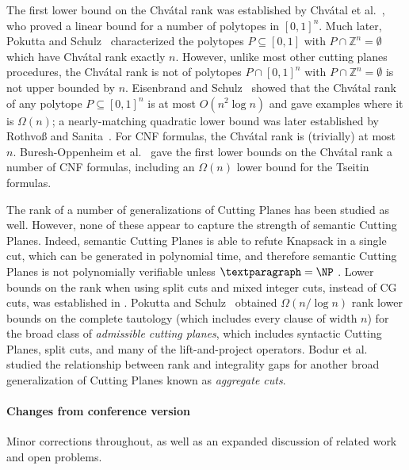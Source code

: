 \documentclass[11pt]{article}
\numberwithin{equation}{section}
\theoremstyle{definition}
\theoremstyle{plain}
\newcounter{cor}\renewcommand{\thecor}{1.1.\arabic{cor}}\newenvironment{cor}{\ifnum\value{cor}=0\refstepcounter{cor}\else\PackageError{toc-native-compat}{Unsupported additional cor envelope}{Only the one exact source-observed cor paragraph is allowed.}\fi}{}\providecommand{\corautorefname}{Theorem}
\begin{document}
The first lower bound on the Chv\'{a}tal rank was established by Chv\'{a}tal et al.~\cite{ChvatalCH89}, who proved a linear bound for a number of polytopes in $[0,1]^n$. Much later, Pokutta and Schulz~\cite{PokuttaS11a} characterized the polytopes $P \subseteq [0,1]$ with $P \cap \mathbb{Z}^n = \emptyset$ which have Chv\'{a}tal rank exactly $n$. However, unlike most other cutting planes procedures, the Chv\'{a}tal rank is not of polytopes $P \cap [0,1]^n$ with $P \cap \mathbb{Z}^n = \emptyset$ is not upper bounded by $n$. Eisenbrand and Schulz~\cite{EisenbrandS99} showed that the Chv\'{a}tal rank of any polytope $P \subseteq [0,1]^n$ is at most $O(n^2 \log n)$ and gave examples where it is $\Omega(n)$; a nearly-matching quadratic lower bound was later established by Rothvo{\ss} and Sanita~\cite{RothvossS13}.
For CNF formulas, the Chv\'{a}tal rank is (trivially) at most $n$. Buresh-Oppenheim et al.~\cite{BGHMP06} gave the first lower bounds on the Chv\'{a}tal rank  a number of CNF formulas, including an $\Omega(n)$ lower bound for the Tseitin formulas. 

The rank of a number of generalizations of Cutting Planes has been studied as well. However, none of these appear to capture the strength of semantic Cutting Planes. %
Indeed, semantic Cutting Planes is able to refute Knapsack in a single cut, which can be generated
%
in polynomial time,  %
and therefore semantic Cutting Planes is not polynomially verifiable unless $\P = \NP$ \cite{FilmusHL16}.
%
%
Lower bounds on the rank when using split cuts and mixed integer cuts, instead of CG cuts, was established in \cite{CornuejolsL02a}.  
Pokutta and Schulz~\cite{PokuttaS10} obtained $\Omega(n/\log n)$ rank lower bounds on the complete tautology (which includes every clause of width $n$) for the broad class of \emph{admissible cutting planes}, which includes syntactic Cutting Planes, split cuts, and many of the lift-and-project operators. Bodur et al.~\cite{BodurPDMP18} studied the relationship between rank and integrality gaps for another broad generalization of Cutting Planes known as \emph{aggregate cuts}. 

%
\paragraph{Changes from conference version \cite{conf-version}}

Minor corrections throughout, as well as an expanded discussion of related work and open problems.
\end{document}
